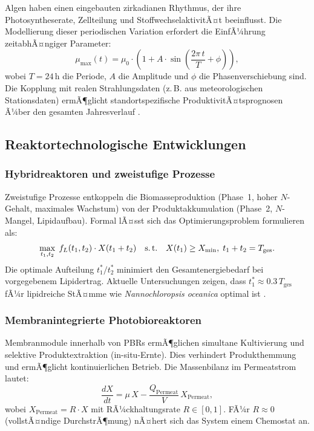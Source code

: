 ﻿\documentclass[a4paper,12pt]{article}
\theoremstyle{definition}
\begin{document}
Algen haben einen eingebauten zirkadianen Rhythmus, der ihre Photosyntheserate,
Zellteilung und StoffwechselaktivitÃ¤t beeinflusst. Die Modellierung dieser
periodischen Variation erfordert die EinfÃ¼hrung zeitabhÃ¤ngiger Parameter:
\[
	\mu_\mathrm{max}(t) = \mu_0 \cdot \left(1 + A \cdot \sin\!\left(\frac{2\pi\,t}{T} + \phi\right)\right),
\]
wobei $T = 24$\,h die Periode, $A$ die Amplitude und $\phi$ die Phasenverschiebung sind.
Die Kopplung mit realen Strahlungsdaten (z.\,B. aus meteorologischen Stationsdaten)
ermÃ¶glicht standortspezifische ProduktivitÃ¤tsprognosen Ã¼ber den gesamten Jahresverlauf
\cite{slegers2011}.

\subsection{Reaktortechnologische Entwicklungen}

\subsubsection{Hybridreaktoren und zweistufige Prozesse}

Zweistufige Prozesse entkoppeln die Biomasseproduktion (Phase~1, hoher $N$-Gehalt,
maximales Wachstum) von der Produktakkumulation (Phase~2, $N$-Mangel, Lipidaufbau).
Formal lÃ¤sst sich das Optimierungsproblem formulieren als:
\[
	\max_{t_1, t_2}\; f_L(t_1, t_2) \cdot X(t_1 + t_2)
	\quad \text{s.\,t.} \quad X(t_1) \geq X_\mathrm{min},\; t_1 + t_2 = T_\mathrm{ges}.
\]
Die optimale Aufteilung $t_1^* / t_2^*$ minimiert den Gesamtenergiebedarf bei
vorgegebenem Lipidertrag. Aktuelle Untersuchungen zeigen, dass $t_1^* \approx 0.3\,T_\mathrm{ges}$
fÃ¼r lipidreiche StÃ¤mme wie \textit{Nannochloropsis oceanica} optimal ist
\cite{breuer2013}.

\subsubsection{Membranintegrierte Photobioreaktoren}

Membranmodule innerhalb von PBRs ermÃ¶glichen simultane Kultivierung und
selektive Produktextraktion (in-situ-Ernte). Dies verhindert Produkthemmung
und ermÃ¶glicht kontinuierlichen Betrieb. Die Massenbilanz im Permeatstrom
lautet:
\[
	\frac{dX}{dt} = \mu\,X - \frac{Q_\mathrm{Permeat}}{V}\,X_\mathrm{Permeat},
\]
wobei $X_\mathrm{Permeat} = R \cdot X$ mit RÃ¼ckhaltungsrate $R \in [0, 1]$.
FÃ¼r $R \approx 0$ (vollstÃ¤ndige DurchstrÃ¶mung) nÃ¤hert sich das System einem
Chemostat an.
\end{document}
